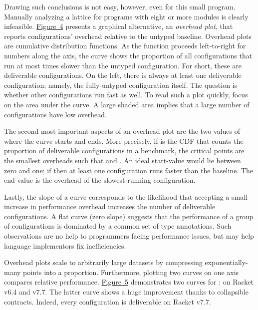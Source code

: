\documentclass[ twoside,open=right,titlepage,numbers=noenddot,headinclude,%
                footinclude=true,cleardoublepage=empty,abstract=off,
                BCOR=5mm,paper=a4,fontsize=11pt,%
                ngerman,american,%
                parts,pdfspacing]{scrreprt}
\newcommand{\FigureRef}[2]{#1}
\begin{document}
\noindent Drawing such conclusions is not easy, however, even for this small program.
Manually analyzing a lattice for programs with eight or more modules is clearly infeasible.
\hyperref[t:x28counter_x28x22figurex22_x22figx3aoverheadx2dplotx2dexamplex22x29x29]{Figure~\FigureRef{4}{t:x28counter_x28x22figurex22_x22figx3aoverheadx2dplotx2dexamplex22x29x29}} presents a graphical alternative,
 an \emph{overhead plot}, that reports configurations{'} overhead relative
 to the untyped baseline.
Overhead plots are cumulative distribution functions.
As the function proceeds left{-}to{-}right for numbers  along the axis,
 the curve shows the proportion of all configurations that run at most
  times slower than the untyped configuration.
For short, these are deliverable configurations.
On the left, there is always at least one deliverable configuration;
 namely, the fully{-}untyped configuration itself.
The question is whether other configurations run fast as well.
To read such a plot quickly, focus on the area under the curve.
A large shaded area implies that a large number of configurations
 have low overhead.

The second most important aspects of an overhead plot are the two values of 
 where the curve starts and ends.
More precisely, if  is the CDF
 that counts the proportion of deliverable
 configurations in a benchmark, the critical points are the smallest
 overheads  such
 that  and .
An ideal start{-}value would lie between zero and one; if  then
 at least one configuration runs faster than the baseline.
The end{-}value  is the overhead of the slowest{-}running configuration.

Lastly, the slope of a curve corresponds to the likelihood that
 accepting a small increase in performance overhead increases the number
 of deliverable configurations.
A flat curve (zero slope) suggests that the performance of a group of
 configurations is dominated by a common set of type annotations.
Such observations are no help to programmers facing performance issues,
 but may help language implementors fix inefficiencies.

Overhead plots scale to arbitrarily large datasets by compressing
 exponentially{-}many points into a proportion.
Furthermore, plotting two curves on one axis compares relative performance.
\hyperref[t:x28counter_x28x22figurex22_x22figx3arelativex2doverheadx2dplotx2dexamplex22x29x29]{Figure~\FigureRef{5}{t:x28counter_x28x22figurex22_x22figx3arelativex2doverheadx2dplotx2dexamplex22x29x29}} demonstrates two curves
 for : on Racket v6.4 and v7.7.
The latter curve shows a huge improvement thanks to collapsible contracts.
Indeed, every  configuration is deliverable on Racket v7.7.
\end{document}
